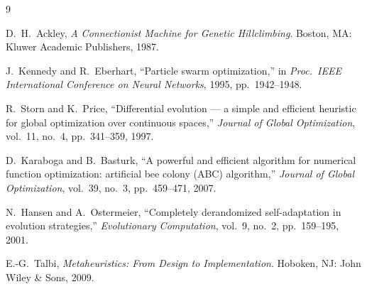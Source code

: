 \documentclass[11pt,a4paper]{article}
\begin{document}
\begin{thebibliography}{9}

D.~H.~Ackley,
\emph{A Connectionist Machine for Genetic Hillclimbing}.
Boston, MA: Kluwer Academic Publishers, 1987.

J.~Kennedy and R.~Eberhart,
``Particle swarm optimization,''
in \emph{Proc.\ IEEE International Conference on Neural Networks}, 1995,
pp.~1942--1948.

R.~Storn and K.~Price,
``Differential evolution --- a simple and efficient heuristic for global
optimization over continuous spaces,''
\emph{Journal of Global Optimization}, vol.~11, no.~4, pp.~341--359, 1997.

D.~Karaboga and B.~Basturk,
``A powerful and efficient algorithm for numerical function optimization:
artificial bee colony (ABC) algorithm,''
\emph{Journal of Global Optimization}, vol.~39, no.~3, pp.~459--471, 2007.

N.~Hansen and A.~Ostermeier,
``Completely derandomized self-adaptation in evolution strategies,''
\emph{Evolutionary Computation}, vol.~9, no.~2, pp.~159--195, 2001.

E.-G.~Talbi,
\emph{Metaheuristics: From Design to Implementation}.
Hoboken, NJ: John Wiley \& Sons, 2009.

\end{thebibliography}
\end{document}

